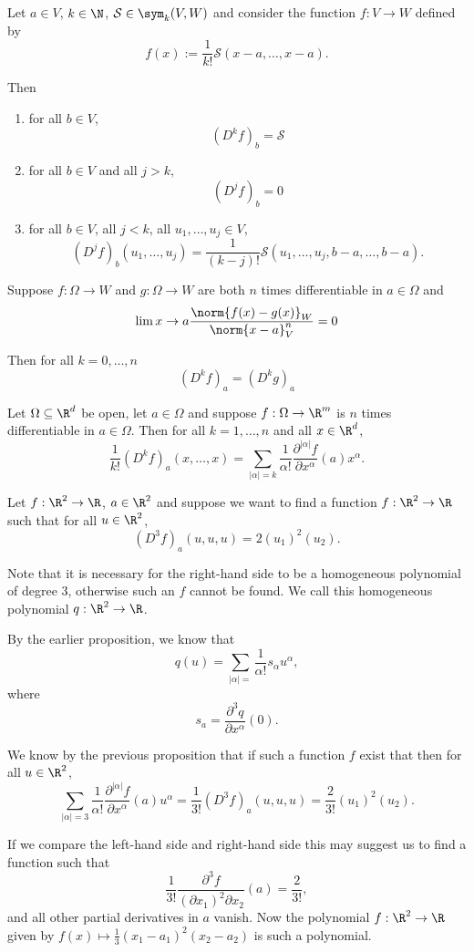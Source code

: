 \begin{proposition}
    Let $a \in V$, $k \in \N$, $\mathcal S \in \sym_k(V,W)$ and consider the function $f:V \to W$
    defined by
    $$f(x) := \frac{1}{k!}\mathcal S(x-a,\dots,x-a).$$
    
    Then
    \begin{enumerate}[label=\roman*]
        \item for all $b \in V$,
            $$(D^kf)_b = \mathcal S$$
        \item for all $b \in V$ and all $j > k,$
            $$(D^jf)_b = 0$$
        \item for all $b \in V$, all $j < k$, all $u_1,\dots,u_j \in V$,
            $$(D^jf)_b(u_1,\dots,u_j) = \frac{1}{(k-j)!}\mathcal S(u_1,\dots,u_j,b-a,\dots,b-a).$$
    \end{enumerate}
\end{proposition}

\begin{proposition}
    Suppose $f:\Omega \to W$ and $g: \Omega \to W$ are both $n$ times differentiable
    in $a \in \Omega$ and
    $$\lim{x \to a} \frac{\norm{f(x)-g(x)}_W}{\norm{x-a}^n_V} = 0$$

    Then for all $k = 0,\dots,n$
    $$(D^kf)_a = (D^kg)_a$$
\end{proposition}

\begin{proposition}
    Let $\Omega \subseteq \R^d$ be open, let $a \in \Omega$ and suppose $f: \Omega \to \R^m$
    is $n$ times differentiable in $a \in \Omega$. Then for all $k=1,\dots,n$ and all $x \in \R^d$,
    $$\frac{1}{k!}(D^kf)_a(x,\dots,x) = \sum_{|\alpha|=k}\frac{1}{\alpha!}\frac{\partial^{|\alpha|}f}{\partial x^\alpha}(a)x^\alpha.$$
\end{proposition}

\begin{example}
    Let $f: \R^2 \to \R$, $a \in \R^2$ and suppose we want to find a function $f:\R^2 \to \R$ such
    that for all $u \in \R^2$,
    $$(D^3f)_a(u,u,u) = 2(u_1)^2(u_2).$$

    Note that it is necessary for the right-hand side to be a homogeneous polynomial of degree 3,
    otherwise such an $f$ cannot be found. We call this homogeneous polynomial $q:\R^2 \to \R$.

    By the earlier proposition, we know that
    $$q(u) = \sum_{|\alpha|=}\frac{1}{\alpha!}s_\alpha u^\alpha,$$
    where
    $$s_a = \frac{\partial^3 q}{\partial x^\alpha}(0).$$

    We know by the previous proposition that if such a function $f$ exist that then for all $u \in \R^2$,
    $$\sum_{|\alpha|=3}\frac{1}{\alpha!}\frac{\partial^{|\alpha|}f}{\partial x^\alpha}(a)u^\alpha = \frac{1}{3!}(D^3f)_a(u,u,u) = \frac{2}{3!}(u_1)^2(u_2).$$

    If we compare the left-hand side and right-hand side this may suggest us to find a function such that
    $$\frac{1}{3!}\frac{\partial^3 f}{(\partial x_1)^2\partial x_2}(a) = \frac{2}{3!},$$
    and all other partial derivatives in $a$ vanish. Now the polynomial $f:\R^2 \to \R$ given by
    $f(x) \mapsto \frac{1}{3}(x_1-a_1)^2(x_2-a_2)$
    is such a polynomial.
\end{example}

